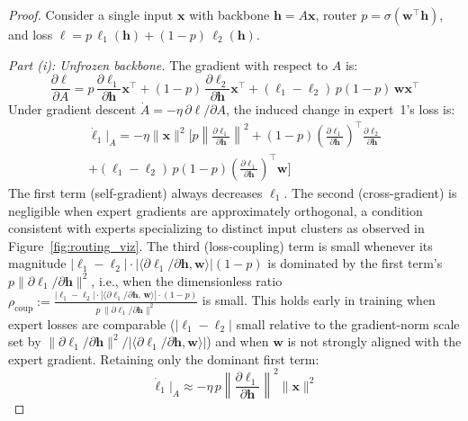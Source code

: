 \documentclass{article}
\begin{document}
\begin{proof}
Consider a single input $\mathbf{x}$ with backbone $\mathbf{h} = A\mathbf{x}$, router $p = \sigma(\mathbf{w}^\top\mathbf{h})$, and loss $\ell = p\,\ell_1(\mathbf{h}) + (1-p)\,\ell_2(\mathbf{h})$.

\emph{Part (i): Unfrozen backbone.} The gradient with respect to $A$ is:
\begin{equation*}
\frac{\partial\ell}{\partial A} = p\,\frac{\partial\ell_1}{\partial\mathbf{h}}\mathbf{x}^\top + (1{-}p)\,\frac{\partial\ell_2}{\partial\mathbf{h}}\mathbf{x}^\top + (\ell_1 - \ell_2)\,p(1{-}p)\,\mathbf{w}\mathbf{x}^\top
\end{equation*}
Under gradient descent $\dot{A} = -\eta\,\partial\ell/\partial A$, the induced change in expert~1's loss is:
\begin{multline*}
\dot{\ell}_1\big|_A = -\eta\|\mathbf{x}\|^2\!\Bigg[p\left\|\frac{\partial\ell_1}{\partial\mathbf{h}}\right\|^2 + (1{-}p)\left(\frac{\partial\ell_1}{\partial\mathbf{h}}\right)^{\!\top}\frac{\partial\ell_2}{\partial\mathbf{h}} \\
 + (\ell_1{-}\ell_2)\,p(1{-}p)\left(\frac{\partial\ell_1}{\partial\mathbf{h}}\right)^{\!\top}\mathbf{w}\Bigg]
\end{multline*}
The first term (self-gradient) always decreases $\ell_1$. The second (cross-gradient) is negligible when expert gradients are approximately orthogonal, a condition consistent with experts specializing to distinct input clusters as observed in Figure~\ref{fig:routing_viz}. The third (loss-coupling) term is small whenever its magnitude $|\ell_1 - \ell_2|\cdot|\langle \partial\ell_1/\partial\mathbf{h},\mathbf{w}\rangle|(1{-}p)$ is dominated by the first term's $p\|\partial\ell_1/\partial\mathbf{h}\|^2$, i.e., when the dimensionless ratio
$\rho_\mathrm{coup} := \frac{|\ell_1{-}\ell_2|\cdot|\langle \partial\ell_1/\partial\mathbf{h},\,\mathbf{w}\rangle|\cdot(1{-}p)}{p\,\|\partial\ell_1/\partial\mathbf{h}\|^2}$
is small. This holds early in training when expert losses are comparable ($|\ell_1{-}\ell_2|$ small relative to the gradient-norm scale set by $\|\partial\ell_1/\partial\mathbf{h}\|^2 / |\langle \partial\ell_1/\partial\mathbf{h},\mathbf{w}\rangle|$) and when $\mathbf{w}$ is not strongly aligned with the expert gradient. Retaining only the dominant first term:
\begin{equation*}
\dot{\ell}_1\big|_A \approx -\eta\,p\left\|\frac{\partial\ell_1}{\partial\mathbf{h}}\right\|^2\|\mathbf{x}\|^2
\end{equation*}

\end{proof}
\end{document}
